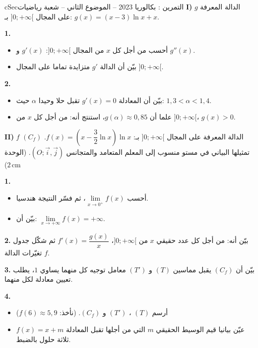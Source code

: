 \documentclass[12pt,a4paper]{article}
\newenvironment{BOX}[2]{\begin{otherlanguage}{english}\begin{arbox}{#1}{#2}}{\end{arbox}\end{otherlanguage}}
\newcounter{exo}
\newenvironment{tamrin}[1]{\stepcounter{exo}\begin{BOX}{cSec}{التمرين \theexo: #1}}{\end{BOX}}
\newenvironment{sq}{\begin{itemize}[leftmargin=2.4em,itemsep=3pt]}{\end{itemize}}
\newcommand{\qa}{\item[(أ)]}\newcommand{\qb}{\item[(ب)]}\newcommand{\qc}{\item[(جـ)]}\newcommand{\qd}{\item[(د)]}\newcommand{\qe}{\item[(هـ)]}
\newcommand{\QQ}[1]{\par\smallskip\textbf{#1.} }
\begin{document}
\begin{tamrin}{بكالوريا 2023 -- الموضوع الثاني -- شعبة رياضيات}
\textbf{I)} $g$ الدالة المعرفة على المجال $]0;+\infty[$ بـ: $g(x)=(x-3)\ln x+x$.
\QQ{1}
\begin{sq}
\qa أحسب من أجل كل $x$ من المجال $]0;+\infty[$: $g'(x)$ و $g''(x)$.
\qb بيّن أن الدالة $g'$ متزايدة تماما على المجال $]0;+\infty[$.
\end{sq}
\QQ{2}
\begin{sq}
\qa بيّن أن المعادلة $g'(x)=0$ تقبل حلا وحيدا $\alpha$ حيث: $1{,}3<\alpha<1{,}4$.
\qb علما أن $g(\alpha)\approx 0{,}85$، استنتج أنه: من أجل كل $x$ من $]0;+\infty[$، $g(x)>0$.
\end{sq}

\textbf{II)} $f$ الدالة المعرفة على المجال $]0;+\infty[$ بـ: $f(x)=\left(x-\dfrac32\ln x\right)\ln x$.
$(C_f)$ تمثيلها البياني في مستو منسوب إلى المعلم المتعامد والمتجانس $(O;\vec i,\vec j)$. (الوحدة $2\,\text{cm}$)
\QQ{1}
\begin{sq}
\qa أحسب $\lim\limits_{x\to 0^{+}}f(x)$، ثم فسّر النتيجة هندسيا.
\qb بيّن أن: $\lim\limits_{x\to +\infty}f(x)=+\infty$.
\end{sq}
\QQ{2} بيّن أنه: من أجل كل عدد حقيقي $x$ من $]0;+\infty[$، $f'(x)=\dfrac{g(x)}{x}$ ثم شكّل جدول تغيّرات الدالة $f$.
\QQ{3} بيّن أن $(C_f)$ يقبل مماسين $(T)$ و $(T')$ معامل توجيه كل منهما يساوي $1$، يطلب تعيين معادلة لكل منهما.
\QQ{4}
\begin{sq}
\qa أرسم $(T)$ ، $(T')$ و $(C_f)$. (نأخذ: $f(6)\approx 5{,}9$)
\qb عيّن بيانيا قيم الوسيط الحقيقي $m$ التي من أجلها تقبل المعادلة $f(x)=x+m$ ثلاثة حلول بالضبط.
\end{sq}
\end{tamrin}
\end{document}
